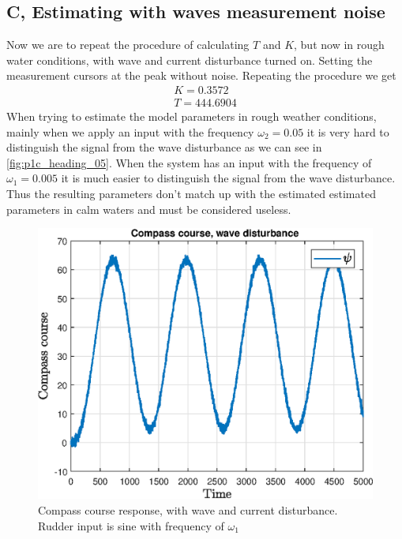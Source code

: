 \subsection{C, Estimating with waves measurement noise}
Now we are to repeat the procedure of calculating $T$ and $K$, but now in rough water conditions, with wave and current disturbance turned on. 
Setting the measurement cursors at the peak without noise. 
Repeating the procedure we get 
\begin{align}
    K = 0.3572\\
    T = 444.6904
\end{align}
When trying to estimate the model parameters in rough weather conditions, mainly when we apply an input with the frequency $\omega_2 = 0.05$ it is very hard to distinguish the signal from the wave disturbance as we can see in \cref{fig:p1c_heading_05}. When the system has an input with the frequency of $\omega_1 = 0.005$ it is much easier to distinguish the signal from the wave disturbance. Thus the resulting parameters don't match up with the estimated estimated parameters in calm waters and must be considered useless.
\begin{figure}
    \centering
    \includegraphics[width = 1.00\textwidth]{figures/plots/P5p1c_heading_005.eps}
    \caption{Compass course response, with wave and current disturbance.  Rudder input is sine with frequency of $\omega_1$}
    \label{fig:p1c_heading_005}
\end{figure}
